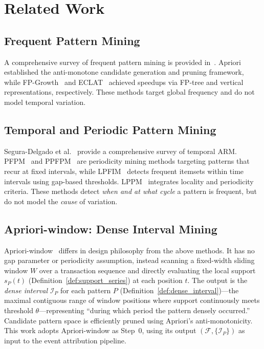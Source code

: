 \section{Related Work}\label{sec:related}

\subsection{Frequent Pattern Mining}

A comprehensive survey of frequent pattern mining is provided in~\cite{fournier2017survey}.
Apriori~\cite{agrawal1994fast} established the anti-monotone candidate generation and pruning framework,
while FP-Growth~\cite{han2000mining} and ECLAT~\cite{zaki2000scalable}
achieved speedups via FP-tree and vertical representations, respectively.
These methods target global frequency and do not model temporal variation.

\subsection{Temporal and Periodic Pattern Mining}

Segura-Delgado et al.~\cite{segura2020temporal} provide a comprehensive survey of temporal ARM.
PFPM~\cite{tanbeer2009discovering} and PPFPM~\cite{kiran2017discovering}
are periodicity mining methods targeting patterns that recur at fixed intervals,
while LPFIM~\cite{mahanta2005finding} detects frequent itemsets within time intervals
using gap-based thresholds.
LPPM~\cite{fournier2021mining} integrates locality and periodicity criteria.
These methods detect \emph{when and at what cycle} a pattern is frequent,
but do not model the \emph{cause} of variation.

\subsection{Apriori-window: Dense Interval Mining}

Apriori-window~\cite{dsaa2025} differs in design philosophy from the above methods.
It has no gap parameter or periodicity assumption, instead scanning a fixed-width
sliding window $W$ over a transaction sequence and directly evaluating
the local support $s_P(t)$ (Definition~\ref{def:support_series}) at each position $t$.
The output is the \emph{dense interval} $\mathcal{I}_P$ for each pattern $P$
(Definition~\ref{def:dense_interval})---the maximal contiguous range of window positions
where support continuously meets threshold $\theta$---representing
``during which period the pattern densely occurred.''
Candidate pattern space is efficiently pruned using Apriori's anti-monotonicity.
This work adopts Apriori-window as Step~0, using its output
$(\mathcal{F}, \{\mathcal{I}_P\})$ as input to the event attribution pipeline.

